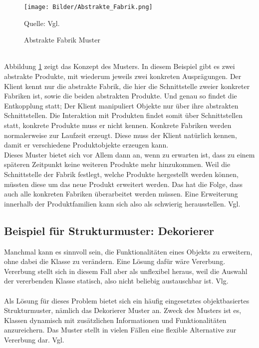 \documentclass[fontsize=11pt,a4paper,final]{scrreprt}[2003/01/01]
\newcommand*{\quelle}{%
	\footnotesize Quelle: 
}
\begin{document}
\begin{figure}[H]
	\centering
	\texttt{[image: Bilder/Abstrakte\_Fabrik.png]}
	\caption{Abstrakte Fabrik Muster}
	\quelle{ Vgl. \cite[S. 109]{gamma2004}}
	\label{fig:Abstrakte_Fabrik}
\end{figure}
\ \\
Abbildung \ref{fig:Abstrakte_Fabrik} zeigt das Konzept des Musters. In diesem Beispiel gibt es zwei abstrakte Produkte, mit wiederum jeweils zwei konkreten Ausprägungen. Der Klient kennt nur die abstrakte Fabrik, die hier die Schnittstelle zweier konkreter Fabriken ist, sowie die beiden abstrakten Produkte. Und genau so findet die Entkopplung statt; Der Klient manipuliert Objekte nur über ihre abstrakten Schnittstellen. Die Interaktion mit Produkten findet somit über Schnittstellen statt, konkrete Produkte muss er nicht kennen. Konkrete Fabriken werden normalerweise zur Laufzeit erzeugt. Diese muss der Klient natürlich kennen, damit er verschiedene Produktobjekte erzeugen kann. \\
Dieses Muster bietet sich vor Allem dann an, wenn zu erwarten ist, dass zu einem späteren Zeitpunkt keine weiteren Produkte mehr hinzukommen. Weil die Schnittstelle der Fabrik festlegt, welche Produkte hergestellt werden können, müssten diese um das neue Produkt erweitert werden. Das hat die Folge, dass auch alle konkreten Fabriken überarbeitet werden müssen. Eine Erweiterung innerhalb der Produktfamilien kann sich also als schwierig herausstellen. Vgl. \cite[S. 109-111]{gamma2004}

\subsection{Beispiel für Strukturmuster: Dekorierer}

Manchmal kann es sinnvoll sein, die Funktionalitäten eines Objekts zu erweitern, ohne dabei die Klasse zu verändern. Eine Lösung dafür wäre Vererbung. Vererbung stellt sich in diesem Fall aber als unflexibel heraus, weil die Auswahl der vererbenden Klasse statisch, also nicht beliebig austauschbar ist. Vlg. \cite[S. 199]{gamma2004}
\\ \\
Als Lösung für dieses Problem bietet sich ein häufig eingesetztes objektbasiertes Strukturmuster, nämlich das Dekorierer Muster an. Zweck des Musters ist es, Klassen dynamisch mit zusätzlichen Informationen und Funktionalitäten anzureichern. Das Muster stellt in vielen Fällen eine flexible Alternative zur Vererbung dar. Vgl. \cite[S. 199 ]{gamma2004}
\end{document}
